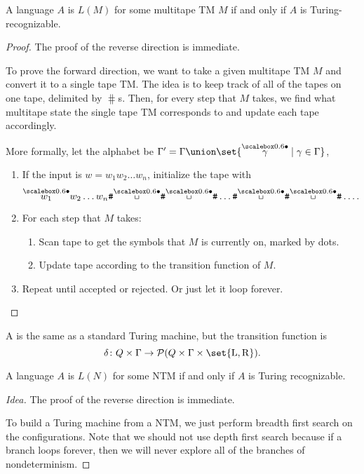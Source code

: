 \documentclass{standalone}
\begin{document}
\begin{proposition}
  A language \(A\) is \(L(M)\) for some multitape \textsf{TM} \(M\)
  if and only if \(A\) is Turing-recognizable.
\end{proposition}
\begin{proof}
  The proof of the reverse direction is immediate.
  
  To prove the forward direction, we want to take
  a given multitape \textsf{TM} \(M\) and
  convert it to a single tape \textsf{TM}.
  The idea is to keep track of all of the tapes on one tape,
  delimited by \(\hash\)s.
  Then, for every step that \(M\) takes,
  we find what multitape state the single tape \textsf{TM}
  corresponds to and update each tape accordingly.

  More formally, let the alphabet be
  \(\Gamma' = \Gamma \union \set{\marksymb{\gamma} \mid \gamma \in \Gamma}\),
  \begin{enumerate}[nosep]
    \item If the input is \(w = w_1 w_2 \ldots w_n\), initialize the tape with
    \[
      \marksymb{w_1} w_2 \ldots w_n
      \hash\marksymb{\blank}\hash\marksymb{\blank}\hash \ldots
      \hash\marksymb{\blank}\hash\marksymb{\blank}\hash \ldots.
    \]

    \item For each step that \(M\) takes:
    \begin{enumerate}[nosep]
      \item Scan tape to get the symbols that \(M\) is currently on,
      marked by dots.
      \item Update tape according to the transition function of \(M\).
    \end{enumerate}

    \item Repeat until accepted or rejected.
          Or just let it loop forever. \qedhere
  \end{enumerate}
\end{proof}

\begin{definition}
  A 
  is the same as a standard Turing machine, but the transition function is
  \[
    \delta \colon Q \times \Gamma
           \to \mathcal{P}(Q \times \Gamma \times \set{\mathrm L, \mathrm R}).
  \]
\end{definition}

\begin{proposition}
  A language \(A\) is \(L(N)\) for some \textsf{NTM}
  if and only if \(A\) is Turing recognizable.
\end{proposition}
\begin{proof}[Idea]
  The proof of the reverse direction is immediate.

  To build a Turing machine from a \textsf{NTM},
  we just perform breadth first search on the configurations.
  Note that we should not use depth first search because
  if a branch loops forever,
  then we will never explore all of the branches of nondeterminism.
\end{proof}
\end{document}
